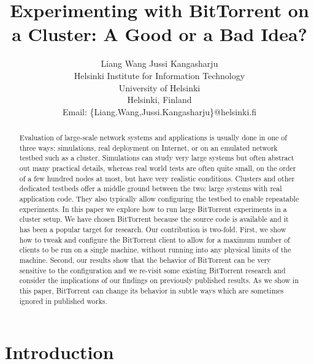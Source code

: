 \documentclass[10pt,letterpaper,twocolumn]{article}
\begin{document}
\title{Experimenting with BitTorrent on a Cluster: A Good or a Bad Idea?}


\author{Liang Wang \quad Jussi Kangasharju\\
  Helsinki Institute for Information Technology\\
  University of Helsinki\\
  Helsinki, Finland\\
  Email: \{Liang.Wang,Jussi.Kangasharju\}@helsinki.fi}

\maketitle

\begin{abstract}
  Evaluation of large-scale network systems and applications is
  usually done in one of three ways: simulations, real deployment on
  Internet, or on an emulated network testbed such as a cluster.
  Simulations can study very large systems but often abstract out many
  practical details, whereas real world tests are often quite small,
  on the order of a few hundred nodes at most, but have very realistic
  conditions. Clusters and other dedicated testbeds offer a middle
  ground between the two: large systems with real application
  code. They also typically allow configuring the testbed to enable
  repeatable experiments. In this paper we explore how to run large
  BitTorrent experiments in a cluster setup. We have chosen BitTorrent
  because the source code is available and it has been a popular
  target for research. Our contribution is two-fold. First, we show
  how to tweak and configure the BitTorrent client to allow for a
  maximum number of clients to be run on a single machine, without
  running into any physical limits of the machine. Second, our results
  show that the behavior of BitTorrent can be very sensitive to the
  configuration and we re-visit some existing BitTorrent research and
  consider the implications of our findings on previously published
  results. As we show in this paper, BitTorrent can change its
  behavior in subtle ways which are sometimes ignored in published
  works.




\end{abstract}


\section{Introduction}
\label{sec:introduction}
\end{document}
